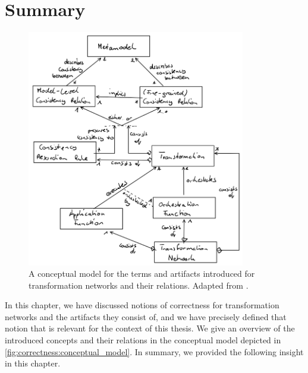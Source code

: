 \section{Summary}
\label{chap:correctness:summary}


\begin{figure}
    \centering
    \includegraphics[width=0.85\textwidth]{figures/correctness/notion/conceptual_model.png}
    \caption[Conceptual model for transformation networks]{A conceptual model for the terms and artifacts introduced for transformation networks and their relations. Adapted from .}
    \label{fig:correctness:conceptual_model}
\end{figure}

In this chapter, we have discussed notions of correctness for transformation networks and the artifacts they consist of, and we have precisely defined that notion that is relevant for the context of this thesis.
We give an overview of the introduced concepts and their relations in the conceptual model depicted in \autoref{fig:correctness:conceptual_model}.
In summary, we provided the following insight in this chapter.


